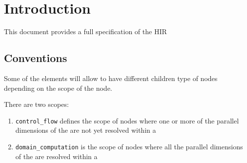 \section{Introduction}


This document provides a full specification of the HIR

\subsection{Conventions}

Some of the elements will allow to have different children type of nodes depending on the scope of the node.

There are two scopes: 
\begin{enumerate}
	\item {\tt control\_flow} defines the scope of nodes where one or more of the parallel dimensions of the  are not yet resolved within a 
	\item {\tt domain\_computation} is the scope of nodes where all the parallel dimensions of the  are resolved within a 
\end{enumerate}
